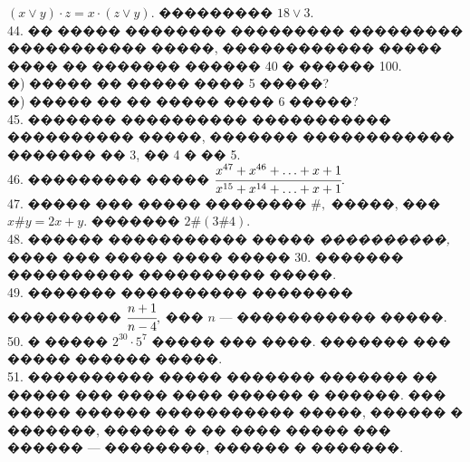\documentclass[12pt]{article}
\begin{document}
$(x\vee y)\cdot z=x\cdot(z\vee y).$ ��������� $18\vee 3.$\\
44. �� ����� �������� ��������� ��������� ����������� �����, ������������ �����
���� �� ������� ������ 40 � ������ 100.\\
�) ����� �� ����� ���� 5 �����?\\
�) ����� �� �� ����� ���� 6 �����?\\
45. ������� ���������� ����������� ���������� �����, ������� ������������ ������� �� 3, �� 4 � �� 5.\\
46. ��������� ����� $\cfrac{x^{47}+x^{46}+\ldots+x+1}{x^{15}+x^{14}+\ldots+x+1}.$\\
47. �����  ��� ����� �������� $\#,$ �����, ��� $x\#y=2x+y.$ ������� $2\#(3\#4).$\\
48. ������ ����������� ����� {\it ����������,} ���� ��� ����� ���� ����� 30. ������� ���������� ���������� �����.\\
49. ������� ���������� �������� ��������� $\cfrac{n+1}{n-4},$ ��� $n$ --- ����������� �����.\\
50. � ����� $2^{30}\cdot5^7$ ����� ��� ����. ������� ��� ����� ������ �����.\\
51. ���������� ����� ������� ������� �� ����� ��� ���� ���� ������ � ������. ��� ����� ������ ����������� �����, ������ � �������, ������ � �� ���� ����� ��� ������ --- ��������, ������ � �������.
\end{document}
